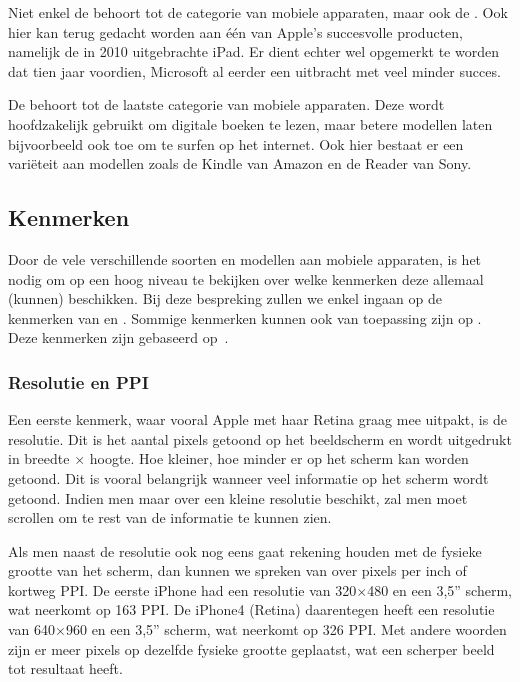 Niet enkel de 	 behoort tot de categorie van mobiele apparaten, maar ook de . Ook hier kan terug gedacht worden aan één van Apple's succesvolle producten, namelijk de in 2010 uitgebrachte iPad. Er dient echter wel opgemerkt te worden dat tien jaar voordien, Microsoft al eerder een  uitbracht met veel minder succes.

De  behoort tot de laatste categorie van mobiele apparaten. Deze wordt hoofdzakelijk gebruikt om digitale boeken te lezen, maar betere modellen laten bijvoorbeeld ook toe om te surfen op het internet. Ook hier bestaat er een variëteit aan modellen zoals de Kindle van Amazon en de Reader van Sony.

\subsection{Kenmerken}
Door de vele verschillende soorten en modellen aan mobiele apparaten, is het nodig om op een hoog niveau te bekijken over welke kenmerken deze allemaal (kunnen) beschikken. Bij deze bespreking zullen we enkel ingaan op de kenmerken van  en . Sommige kenmerken kunnen ook van toepassing zijn op . Deze kenmerken zijn gebaseerd op~\cite{PhilDutson2012}.

\subsubsection{Resolutie en PPI}
Een eerste kenmerk, waar vooral Apple met haar Retina graag mee uitpakt, is de resolutie. Dit is het aantal pixels getoond op het beeldscherm en wordt uitgedrukt in breedte $\times$ hoogte. Hoe kleiner, hoe minder er op het scherm kan worden getoond. Dit is vooral belangrijk wanneer veel informatie op het scherm wordt getoond. Indien men maar over een kleine resolutie beschikt, zal men moet scrollen om te rest van de informatie te kunnen zien.

Als men naast de resolutie ook nog eens gaat rekening houden met de fysieke grootte van het scherm, dan kunnen we spreken van over pixels per inch of kortweg PPI. De eerste iPhone had een resolutie van 320$\times$480 en een 3,5” scherm, wat neerkomt op 163 PPI. De iPhone4 (Retina) daarentegen heeft een resolutie van 640$\times$960 en een 3,5” scherm, wat neerkomt op 326 PPI. Met andere woorden zijn er meer pixels op dezelfde fysieke grootte geplaatst, wat een scherper beeld tot resultaat heeft.

